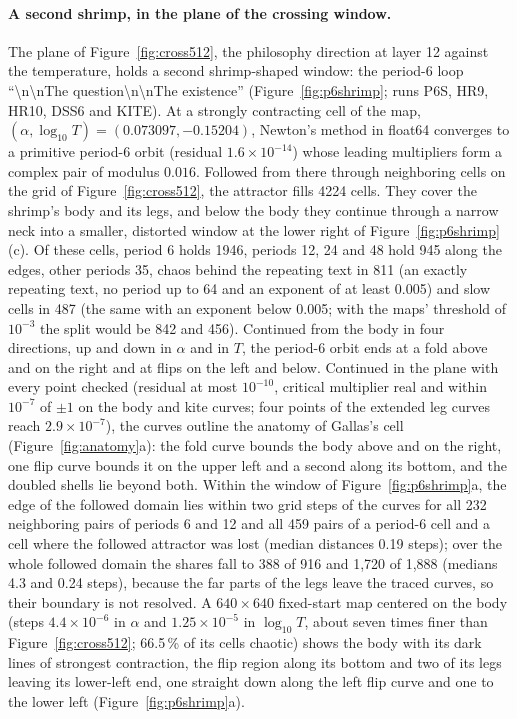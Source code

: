 \documentclass[11pt,letterpaper]{article}
\begin{document}
\paragraph{A second shrimp, in the plane of the crossing window.} The plane of Figure~\ref{fig:cross512}, the philosophy
direction at layer 12 against the temperature, holds a second shrimp-shaped window: the period-6 loop
``\textbackslash n\textbackslash nThe question\textbackslash n\textbackslash nThe existence'' (Figure~\ref{fig:p6shrimp};
runs P6S, HR9, HR10, DSS6 and KITE). At a strongly contracting cell of the map, $(\alpha,\log_{10}T)=(0.073097,-0.15204)$,
Newton's method in float64 converges to a primitive period-6 orbit (residual $1.6\times10^{-14}$) whose leading
multipliers form a complex pair of modulus $0.016$. Followed from there through neighboring cells on the grid of
Figure~\ref{fig:cross512}, the attractor fills 4224 cells. They cover the shrimp's body and its legs, and below the body they continue through a narrow neck into a smaller,
distorted window at the lower right of Figure~\ref{fig:p6shrimp}(c). Of these cells, period 6 holds
1946, periods 12, 24 and 48 hold 945 along the edges, other periods 35, chaos behind the repeating text in 811 (an exactly repeating text, no period up to
64 and an exponent of at least 0.005) and slow cells in 487 (the same with an exponent below 0.005; with the maps'
threshold of $10^{-3}$ the split would be 842 and 456). Continued from the body in four directions, up and down in $\alpha$ and in $T$, the period-6 orbit
ends at a fold above and on the right and at flips on the left and below. Continued in the plane with every point checked (residual at most $10^{-10}$, critical multiplier real and within
$10^{-7}$ of $\pm1$ on the body and kite curves; four points of the extended leg curves reach $2.9\times10^{-7}$), the curves outline the anatomy of Gallas's cell (Figure~\ref{fig:anatomy}a): the fold curve bounds
the body above and on the right, one flip curve bounds it on the upper left and a second along its bottom, and the
doubled shells lie beyond both. Within the window of Figure~\ref{fig:p6shrimp}a, the edge of the followed domain lies within two grid steps of the
curves for all 232 neighboring pairs of periods 6 and 12 and all 459 pairs of a period-6 cell and a cell where the followed attractor was lost (median
distances 0.19 steps); over the whole followed domain the shares fall to 388 of 916 and 1{,}720 of 1{,}888 (medians 4.3
and 0.24 steps), because the far parts of the legs leave the traced curves, so their boundary is not resolved. A
$640\times640$ fixed-start map centered on the body (steps $4.4\times10^{-6}$ in $\alpha$ and $1.25\times10^{-5}$ in
$\log_{10}T$, about seven times finer than Figure~\ref{fig:cross512}; 66.5\,\% of its cells chaotic) shows the body
with its dark lines of strongest contraction, the flip region along its bottom and two of its legs leaving its
lower-left end, one straight down along the left flip curve and one to the lower left (Figure~\ref{fig:p6shrimp}a).
\end{document}
